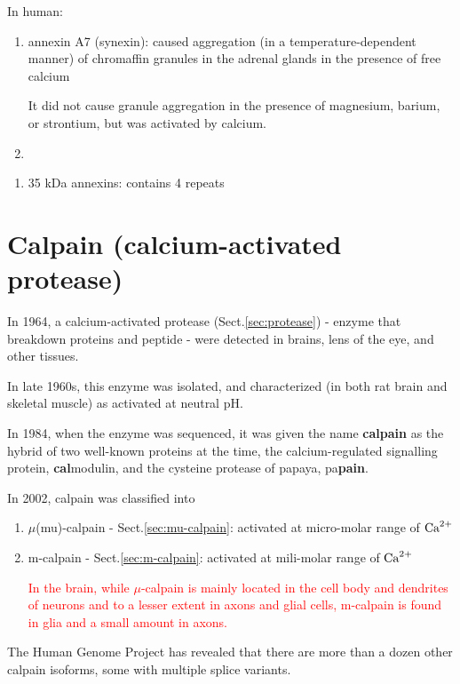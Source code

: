 In human: 
\begin{enumerate}
  \item  annexin A7 (synexin):  caused aggregation (in a temperature-dependent
  manner) of chromaffin granules in the adrenal glands in the presence of free
  calcium
  
  It did not cause granule aggregation in the presence of magnesium, barium, or
  strontium, but was activated by calcium.
  
  \item 
\end{enumerate}



\begin{enumerate}
  \item 35 kDa annexins: contains 4 repeats
\end{enumerate}

\section{Calpain (calcium-activated protease)}
\label{sec:calpain}

In 1964, a calcium-activated protease (Sect.\ref{sec:protease}) - enzyme that
breakdown proteins and peptide - were detected in brains, lens of the eye, and
other tissues.

In late 1960s, this enzyme was isolated, and characterized (in both rat brain
and skeletal muscle) as activated at neutral pH.

In 1984, when the enzyme was sequenced, it was given the name {\bf calpain} as
the hybrid of two well-known proteins at the time, the calcium-regulated
signalling protein, {\bf cal}modulin, and the cysteine protease of papaya,
pa{\bf pain}.

In 2002, calpain was classified into 
\begin{enumerate}
  \item $\mu$(mu)-calpain - Sect.\ref{sec:mu-calpain}: activated at micro-molar
  range of ${\text{Ca}^{2+}}$

  \item m-calpain - Sect.\ref{sec:m-calpain}: activated at mili-molar range of
  ${\text{Ca}^{2+}}$
 
\textcolor{red}{In the brain, while $\mu$-calpain is mainly located in the cell
body and dendrites of neurons and to a lesser extent in axons and glial cells,
m-calpain is found in glia and a small amount in axons. }

\end{enumerate}
The Human Genome Project has revealed that there are more than a dozen other
calpain isoforms, some with multiple splice variants.


